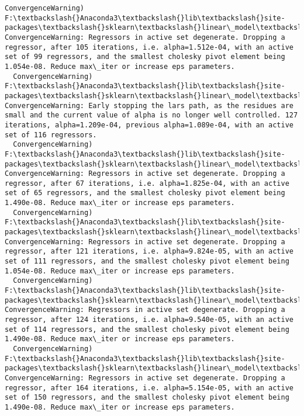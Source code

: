 \documentclass[11pt]{article}
\begin{document}
\begin{Verbatim}[commandchars=\\\{\}]
  ConvergenceWarning)
F:\textbackslash{}Anaconda3\textbackslash{}lib\textbackslash{}site-packages\textbackslash{}sklearn\textbackslash{}linear\_model\textbackslash{}least\_angle.py:313: ConvergenceWarning: Regressors in active set degenerate. Dropping a regressor, after 105 iterations, i.e. alpha=1.512e-04, with an active set of 99 regressors, and the smallest cholesky pivot element being 1.054e-08. Reduce max\_iter or increase eps parameters.
  ConvergenceWarning)
F:\textbackslash{}Anaconda3\textbackslash{}lib\textbackslash{}site-packages\textbackslash{}sklearn\textbackslash{}linear\_model\textbackslash{}least\_angle.py:339: ConvergenceWarning: Early stopping the lars path, as the residues are small and the current value of alpha is no longer well controlled. 127 iterations, alpha=1.209e-04, previous alpha=1.089e-04, with an active set of 116 regressors.
  ConvergenceWarning)
F:\textbackslash{}Anaconda3\textbackslash{}lib\textbackslash{}site-packages\textbackslash{}sklearn\textbackslash{}linear\_model\textbackslash{}least\_angle.py:313: ConvergenceWarning: Regressors in active set degenerate. Dropping a regressor, after 67 iterations, i.e. alpha=1.825e-04, with an active set of 65 regressors, and the smallest cholesky pivot element being 1.490e-08. Reduce max\_iter or increase eps parameters.
  ConvergenceWarning)
F:\textbackslash{}Anaconda3\textbackslash{}lib\textbackslash{}site-packages\textbackslash{}sklearn\textbackslash{}linear\_model\textbackslash{}least\_angle.py:313: ConvergenceWarning: Regressors in active set degenerate. Dropping a regressor, after 121 iterations, i.e. alpha=9.824e-05, with an active set of 111 regressors, and the smallest cholesky pivot element being 1.054e-08. Reduce max\_iter or increase eps parameters.
  ConvergenceWarning)
F:\textbackslash{}Anaconda3\textbackslash{}lib\textbackslash{}site-packages\textbackslash{}sklearn\textbackslash{}linear\_model\textbackslash{}least\_angle.py:313: ConvergenceWarning: Regressors in active set degenerate. Dropping a regressor, after 124 iterations, i.e. alpha=9.540e-05, with an active set of 114 regressors, and the smallest cholesky pivot element being 1.490e-08. Reduce max\_iter or increase eps parameters.
  ConvergenceWarning)
F:\textbackslash{}Anaconda3\textbackslash{}lib\textbackslash{}site-packages\textbackslash{}sklearn\textbackslash{}linear\_model\textbackslash{}least\_angle.py:313: ConvergenceWarning: Regressors in active set degenerate. Dropping a regressor, after 164 iterations, i.e. alpha=5.154e-05, with an active set of 150 regressors, and the smallest cholesky pivot element being 1.490e-08. Reduce max\_iter or increase eps parameters.

\end{Verbatim}
\end{document}
